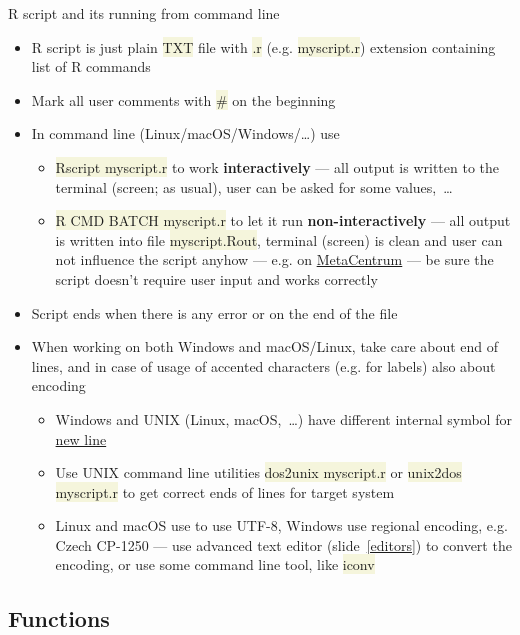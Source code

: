 \documentclass[compress, ucs, xelatex, 11pt, xcolor=svgnames, aspectratio=169,
	hyperref={
		bookmarks=true,
		unicode=true,
		colorlinks=true,
		pdftitle={Molecular data in R},
		plainpages=false,
		pdfauthor={Vojtech Zeisek},
		pdfsubject={Course about phylogeny and evolution in R},
		pdfcreator={XeLaTeX},
		pdfkeywords={R, evolution, phylogeny, molecular data},
		linkcolor=Crimson, %
		anchorcolor=Magenta, %
		citecolor=Magenta, %
		filecolor=Magenta, %
		menucolor=Magenta, %
		urlcolor=DodgerBlue, %
		pdftex},
	url={hyphens, lowtilde} %
	]{beamer}
\renewcommand{\texttt}[1]{\colorbox{Beige}{{\ttfamily #1}}}
\begin{document}
\begin{frame}[allowframebreaks]{R script and its running from command line}
	\begin{itemize}
		\item R script is just plain \texttt{TXT} file with \texttt{.r} (e.g. \texttt{myscript.r}) extension containing list of R commands
		\item Mark all user comments with \texttt{\#} on the beginning
		\item In command line (Linux/macOS/Windows/\ldots) use
		\begin{itemize}
			\item \texttt{Rscript myscript.r} to work \textbf{interactively} --- all output is written to the terminal (screen; as usual), user can be asked for some values,~\ldots
			\item \texttt{R CMD BATCH myscript.r} to let it run \textbf{non-interactively} --- all output is written into file \texttt{myscript.Rout}, terminal (screen) is clean and user can not influence the script anyhow --- e.g. on \href{https://www.metacentrum.cz/}{MetaCentrum} --- be sure the script doesn't require user input and works correctly
		\end{itemize}
		\item Script ends when there is any error or on the end of the file
		\item When working on both Windows and macOS/Linux, take care about end of lines, and in case of usage of accented characters (e.g. for labels) also about encoding
		\begin{itemize}
			\item Windows and UNIX (Linux, macOS,~\ldots) have different internal symbol for \href{https://en.wikipedia.org/wiki/Newline}{new line}
			\item Use UNIX command line utilities \texttt{dos2unix myscript.r} or \texttt{unix2dos myscript.r} to get correct ends of lines for target system
			\item Linux and macOS use to use UTF-8, Windows use regional encoding, e.g. Czech CP-1250 --- use advanced text editor (slide~\ref{editors}) to convert the encoding, or use some command line tool, like \texttt{iconv}
		\end{itemize}
	\end{itemize}
\end{frame}

\subsection{Functions}
\end{document}
